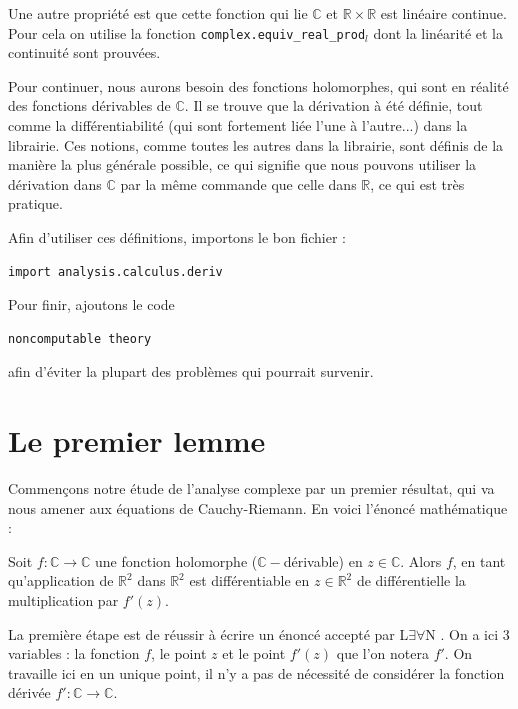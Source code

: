 \documentclass[a4paper, 11pt, twoside]{report}
\newcommand\R{\mathbb{R}}
\newcommand\C{\mathbb{C}}
\newcommand{\LEAN}{L$\exists\forall$N }
\begin{document}
Une autre propriété est que cette fonction qui lie $\C$ et $\R\times\R$ est linéaire continue. Pour cela on utilise la fonction \verb|complex.equiv_real_prod|$_l$ dont la linéarité et la continuité sont prouvées.

\medskip

Pour continuer, nous aurons besoin des fonctions holomorphes, qui sont en réalité des fonctions dérivables de $\C$. Il se trouve que la dérivation à été définie, tout comme la différentiabilité (qui sont fortement liée l'une à l'autre...) dans la librairie. Ces notions, comme toutes les autres dans la librairie, sont définis de la manière la plus générale possible, ce qui signifie que nous pouvons utiliser la dérivation dans $\C$ par la même commande que celle dans $\R$, ce qui est très pratique. 

Afin d'utiliser ces définitions, importons le bon fichier :

\begin{lstlisting}
import analysis.calculus.deriv 
\end{lstlisting}

Pour finir, ajoutons le code

\begin{lstlisting}
noncomputable theory 
\end{lstlisting}

afin d'éviter la plupart des problèmes qui pourrait survenir.

\section{Le premier lemme}

Commençons notre étude de l'analyse complexe par un premier résultat, qui va nous amener aux équations de Cauchy-Riemann. En voici l'énoncé mathématique :

\begin{tcolorbox}[colback = red!10, colframe = red!80, title = Holomorphe $\Longrightarrow$ différentiable sur $\R^2$, fonttitle = \large\bfseries]
	Soit $f : \C\to \C$ une fonction holomorphe ($\C-$dérivable) en $z\in\C$. Alors $f$, en tant qu'application de $\R^2$ dans $\R^2$ est différentiable en $z\in\R^2$ de différentielle la multiplication par $f'(z)$.
\end{tcolorbox}

La première étape est de réussir à écrire un énoncé accepté par \LEAN. On a ici 3 variables : la fonction $f$, le point $z$ et le point $f'(z)$ que l'on notera $f'$. On travaille ici en un unique point, il n'y a pas de nécessité de considérer la fonction dérivée $f':\C\to \C$. 
\end{document}
